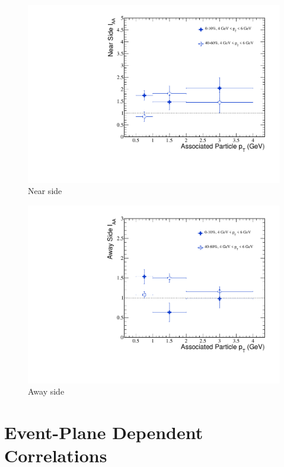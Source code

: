 \begin{figure}[htbp]
\begin{center}
\includegraphics[scale=.8]{Plots/Correlations/IAA_Near.pdf}
\end{center}
\caption[Near Side $I_{AA}$]{Near side}
\label{fig:IAA_Near}
\end{figure}

\begin{figure}[htbp]
\begin{center}
\includegraphics[scale=.8]{Plots/Correlations/IAA_Away.pdf}
\end{center}
\caption[Away Side $I_{AA}$]{Away side}
\label{fig:IAA_Away}
\end{figure}

\section{Event-Plane Dependent Correlations}

